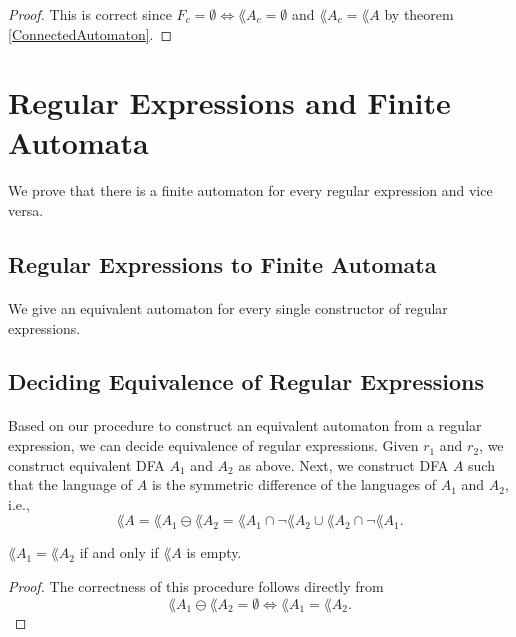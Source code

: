 \documentclass[11pt,a4paper,oneside]{book}
\begin{document}
            \begin{proof}
                This is correct since $F_c = \emptyset \Leftrightarrow \lang{A_c} = \emptyset$ and $\lang{A_c} = \lang{A}$ by theorem \ref{ConnectedAutomaton}.
            \end{proof}


        \section{Regular Expressions and Finite Automata}

            \paragraph{} 
                We prove that there is a finite automaton for every regular expression and vice versa. 

            \subsection{Regular Expressions to Finite Automata}

                \paragraph{} 
                    We give an equivalent automaton for every single constructor of regular expressions.


            \subsection{Deciding Equivalence of Regular Expressions}

                \paragraph{} 
                    Based on our procedure to construct an equivalent automaton from a regular expression, we can decide equivalence of regular expressions. Given $r_1$ and $r_2$, we construct equivalent DFA $A_1$ and $A_2$ as above.
                    Next, we construct DFA $A$ such that the language of $A$ is the symmetric difference of the languages of $A_1$ and $A_2$, i.e.,
                    \[ \lang{A} = \lang{A_1} \ominus \lang{A_2} = \lang{A_1} \cap \neg \lang{A_2} \cup \lang{A_2} \cap \neg \lang{A_1}.
                    \]
                    \begin{theorem}
                        $\lang{A_1} = \lang{A_2}$ if and only if $\lang{A}$ is empty. 
                    \end{theorem}
                    \begin{proof}
                        The correctness of this procedure follows directly from 
                        \[ 
                            \lang{A_1} \ominus \lang{A_2} = \emptyset \Leftrightarrow \lang{A_1} = \lang{A_2}.
                        \]
                    \end{proof}
                    
\end{document}
